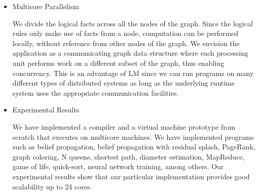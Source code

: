 \begin{itemize}
   \item Multicore Parallelism
   
   We divide the logical facts across all the nodes of the graph. Since the
   logical rules only make use of facts from a node, computation can be
   performed locally, without reference from other nodes of the graph.
   We envision the application as a communicating graph data structure where
   each processing unit performs work on a different subset of the graph, thus
   enabling concurrency. This is an advantage of LM since we can run programs on
   many different types of distributed systems as long as the underlying runtime
   system uses the appropriate communication facilities.

   \item Experimental Results

   We have implemented a compiler and a virtual machine prototype from
   scratch that executes on multicore machines.  We have implemented programs
   such as belief propagation, belief propagation with residual splash,
   PageRank, graph coloring, N queens, shortest path, diameter estimation,
   MapReduce, game of life, quick-sort, neural network training, among others.
   Our experimental results show that our particular implementation provides
   good scalability up to 24 cores.
   
\end{itemize}
